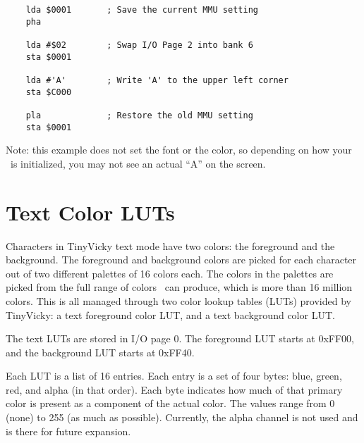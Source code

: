 \begin{verbatim}
    lda $0001       ; Save the current MMU setting
    pha

    lda #$02        ; Swap I/O Page 2 into bank 6
    sta $0001

    lda #'A'        ; Write 'A' to the upper left corner
    sta $C000

    pla             ; Restore the old MMU setting
    sta $0001
\end{verbatim}

Note: this example does not set the font or the color, so depending on how your \jr\ is initialized, you may not see an actual ``A'' on the screen.

\section*{Text Color LUTs}

Characters in TinyVicky text mode have two colors: the foreground and the background. The foreground and background colors are picked for each character out of two different palettes of 16 colors each. The colors in the palettes are picked from the full range of colors \jr\ can produce, which is more than 16 million colors. This is all managed through two color lookup tables (LUTs) provided by TinyVicky: a text foreground color LUT, and a text background color LUT.

The text LUTs are stored in I/O page 0. The foreground LUT starts at 0xFF00, and the background LUT starts at 0xFF40.

Each LUT is a list of 16 entries. Each entry is a set of four bytes: blue, green, red, and alpha (in that order). Each byte indicates how much of that primary color is present as a component of the actual color. The values range from 0 (none) to 255 (as much as possible). Currently, the alpha channel is not used and is there for future expansion.

